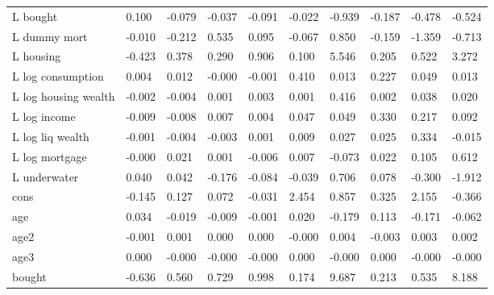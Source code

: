 \begin{table}[htbp]
\begin{tabular}{llllllllll}
L bought &     0.100 &    -0.079 &    -0.037 &    -0.091 &    -0.022 &    -0.939 &    -0.187 &    -0.478 &    -0.524 \\  
L dummy mort &    -0.010 &    -0.212 &     0.535 &     0.095 &    -0.067 &     0.850 &    -0.159 &    -1.359 &    -0.713 \\  
L housing &    -0.423 &     0.378 &     0.290 &     0.906 &     0.100 &     5.546 &     0.205 &     0.522 &     3.272 \\  
L log consumption &     0.004 &     0.012 &    -0.000 &    -0.001 &     0.410 &     0.013 &     0.227 &     0.049 &     0.013 \\  
L log housing wealth &    -0.002 &    -0.004 &     0.001 &     0.003 &     0.001 &     0.416 &     0.002 &     0.038 &     0.020 \\  
L log income &    -0.009 &    -0.008 &     0.007 &     0.004 &     0.047 &     0.049 &     0.330 &     0.217 &     0.092 \\  
L log liq wealth &    -0.001 &    -0.004 &    -0.003 &     0.001 &     0.009 &     0.027 &     0.025 &     0.334 &    -0.015 \\  
L log mortgage &    -0.000 &     0.021 &     0.001 &    -0.006 &     0.007 &    -0.073 &     0.022 &     0.105 &     0.612 \\  
L underwater &     0.040 &     0.042 &    -0.176 &    -0.084 &    -0.039 &     0.706 &     0.078 &    -0.300 &    -1.912 \\  
cons &    -0.145 &     0.127 &     0.072 &    -0.031 &     2.454 &     0.857 &     0.325 &     2.155 &    -0.366 \\  
age &     0.034 &    -0.019 &    -0.009 &    -0.001 &     0.020 &    -0.179 &     0.113 &    -0.171 &    -0.062 \\  
age2 &    -0.001 &     0.001 &     0.000 &     0.000 &    -0.000 &     0.004 &    -0.003 &     0.003 &     0.002 \\  
age3 &     0.000 &    -0.000 &    -0.000 &    -0.000 &     0.000 &    -0.000 &     0.000 &    -0.000 &    -0.000 \\  
bought &    -0.636 &     0.560 &     0.729 &     0.998 &     0.174 &     9.687 &     0.213 &     0.535 &     8.188 \\  
\hline \hline \end{tabular}
\end{table}
